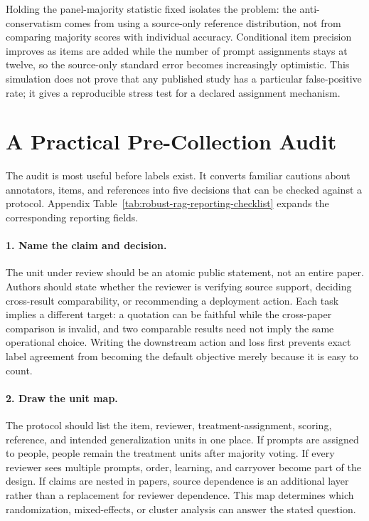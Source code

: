 \documentclass[11pt]{article}
\begin{document}
Holding the panel-majority statistic fixed isolates the problem: the
anti-conservatism comes from using a source-only reference distribution, not
from comparing majority scores with individual accuracy. Conditional item
precision improves as items are added while the number of prompt assignments
stays at twelve, so the source-only standard error becomes increasingly
optimistic. This simulation does not prove that any published study has a
particular false-positive rate; it gives a reproducible stress test for a
declared assignment mechanism.

\section{A Practical Pre-Collection Audit}
\label{sec:practical-audit}

The audit is most useful before labels exist. It converts familiar cautions
about annotators, items, and references into five decisions that can be
checked against a protocol. Appendix
Table~\ref{tab:robust-rag-reporting-checklist} expands the corresponding
reporting fields.

\paragraph{1. Name the claim and decision.}
The unit under review should be an atomic public statement, not an entire
paper. Authors should state whether the reviewer is verifying source support,
deciding cross-result comparability, or recommending a deployment action.
Each task implies a different target: a quotation can be faithful while the
cross-paper comparison is invalid, and two comparable results need not imply
the same operational choice. Writing the downstream action and loss first
prevents exact label agreement from becoming the default objective merely
because it is easy to count.

\paragraph{2. Draw the unit map.}
The protocol should list the item, reviewer, treatment-assignment, scoring,
reference, and intended generalization units in one place. If prompts are
assigned to people, people remain the treatment units after majority voting.
If every reviewer sees multiple prompts, order, learning, and carryover become
part of the design. If claims are nested in papers, source dependence is an
additional layer rather than a replacement for reviewer dependence. This map
determines which randomization, mixed-effects, or cluster analysis can answer
the stated question.
\end{document}
